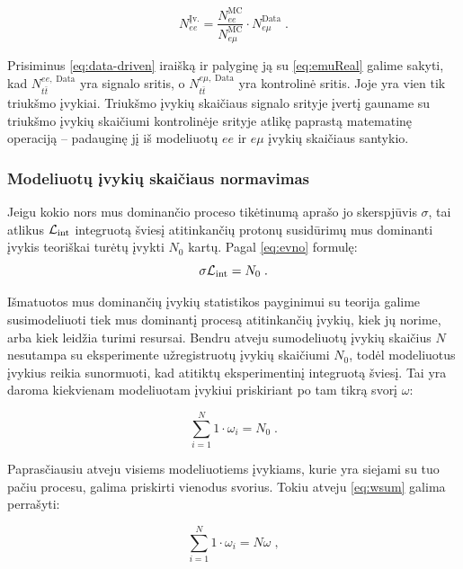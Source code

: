 \documentclass[a4paper, 12pt]{article}
\newcommand{\emu}{e\mu}
\newcommand{\Lumi}{{\cal L}_\mathrm{int}}
\newlength\q
\begin{document}
\begin{equation}
	N_{ee}^{\mathrm{Įv.}} =
	\frac{ N_{ee}^{\mathrm{MC}} }{ N_{\emu}^{\mathrm{MC}} }
	\cdot N_{\emu}^{\mathrm{Data}} \; .
	\label{eq:emuReal}
\end{equation}

Prisiminus \eqref{eq:data-driven} iraišką ir palyginę ją su \eqref{eq:emuReal} galime
sakyti, kad $N_{t\bar{t}}^{ee , \; \mathrm{Data}}$ yra signalo sritis, o
$N_{t\bar{t}}^{e\mu , \; \mathrm{Data}}$ yra kontrolinė sritis. Joje yra vien tik triukšmo
įvykiai.
Triukšmo įvykių skaičiaus signalo srityje įvertį gauname su triukšmo įvykių skaičiumi
kontrolinėje srityje atlikę paprastą matematinę operaciją -- padauginę jį iš modeliuotų
$ee$ ir $\emu$ įvykių skaičiaus santykio.


\subsubsection{Modeliuotų įvykių skaičiaus normavimas}\label{sec:MCweight}

Jeigu kokio nors mus dominančio proceso tikėtinumą aprašo jo skerspjūvis $\sigma$, tai atlikus
$\Lumi$ integruotą šviesį atitinkančių protonų susidūrimų mus dominanti įvykis teoriškai turėtų
įvykti $N_{0}$ kartų. Pagal \eqref{eq:evno} formulę:
\begin{equation}
	\sigma \Lumi=N_{0} \; .
	\label{eq:ilumi}
\end{equation}

Išmatuotos mus dominančių įvykių statistikos payginimui su teorija galime susimodeliuoti tiek mus
dominantį procesą atitinkančių įvykių, kiek jų norime, arba kiek leidžia turimi resursai.
Bendru atveju sumodeliuotų įvykių skaičius $N$ nesutampa su eksperimente užregistruotų įvykių
skaičiumi $N_0$, todėl modeliuotus įvykius reikia sunormuoti, kad atitiktų eksperimentinį
integruotą šviesį.
Tai yra daroma kiekvienam modeliuotam įvykiui priskiriant po tam tikrą svorį $\omega$:

\begin{equation}
	\sum_{i=1}^{N}1\cdot \omega_{i}=N_{0} \; .
	\label{eq:wsum}
\end{equation}

Paprasčiausiu atveju visiems modeliuotiems įvykiams, kurie yra siejami su tuo pačiu procesu,
galima priskirti vienodus svorius. Tokiu atveju \eqref{eq:wsum} galima perrašyti:

\begin{equation}
	\sum_{i=1}^{N} 1 \cdot \omega_{i} = N \omega \; ,
	\label{eq:swsum}
\end{equation}
\end{document}
